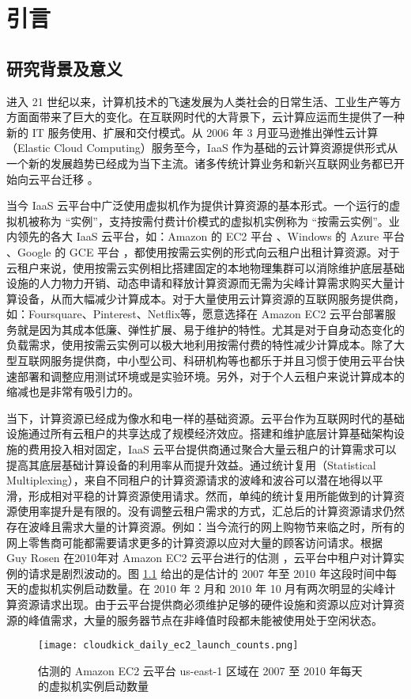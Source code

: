 \chapter{引言}
\label{cha:intro}

\section{研究背景及意义}
进入 21 世纪以来，计算机技术的飞速发展为人类社会的日常生活、工业生产等方方面面带来了巨大的变化。在互联网时代的大背景下，云计算应运而生提供了一种新的 IT 服务使用、扩展和交付模式。从 2006 年 3 月亚马逊推出弹性云计算（Elastic Cloud Computing）服务至今，IaaS 作为基础的云计算资源提供形式从一个新的发展趋势已经成为当下主流。诸多传统计算业务和新兴互联网业务都已开始向云平台迁移 \cite{Armbrust:2010:VCC:1721654.1721672}。

当今 IaaS 云平台中广泛使用虚拟机作为提供计算资源的基本形式。一个运行的虚拟机被称为 ``实例''，支持按需付费计价模式的虚拟机实例称为 ``按需云实例''。业内领先的各大 IaaS 云平台，如：Amazon 的 EC2 平台 \cite{AWS}、Windows 的 Azure 平台 \cite{Azure}、Google 的 GCE 平台 \cite{GCE}，都使用按需云实例的形式向云租户出租计算资源。对于云租户来说，使用按需云实例相比搭建固定的本地物理集群可以消除维护底层基础设施的人力物力开销、动态申请和释放计算资源而无需为尖峰计算需求购买大量计算设备，从而大幅减少计算成本。对于大量使用云计算资源的互联网服务提供商，如：Foursquare、Pinterest、Netflix等，愿意选择在 Amazon EC2 云平台部署服务就是因为其成本低廉、弹性扩展、易于维护的特性。尤其是对于自身动态变化的负载需求，使用按需云实例可以极大地利用按需付费的特性减少计算成本。除了大型互联网服务提供商，中小型公司、科研机构等也都乐于并且习惯于使用云平台快速部署和调整应用测试环境或是实验环境。另外，对于个人云租户来说计算成本的缩减也是非常有吸引力的。

当下，计算资源已经成为像水和电一样的基础资源。云平台作为互联网时代的基础设施通过所有云租户的共享达成了规模经济效应。搭建和维护底层计算基础架构设施的费用投入相对固定，IaaS 云平台提供商通过聚合大量云租户的计算需求可以提高其底层基础计算设备的利用率从而提升效益。通过统计复用（Statistical Multiplexing），来自不同租户的计算资源请求的波峰和波谷可以潜在地得以平滑，形成相对平稳的计算资源使用请求。然而，单纯的统计复用所能做到的计算资源使用率提升是有限的。没有调整云租户需求的方式，汇总后的计算资源请求仍然存在波峰且需求大量的计算资源。例如：当今流行的网上购物节来临之时，所有的网上零售商可能都需要请求更多的计算资源以应对大量的顾客访问请求。根据 Guy Rosen 在2010年对 Amazon EC2 云平台进行的估测 \cite{ec2dailyusage}，云平台中租户对计算实例的请求是剧烈波动的。图 \ref{figure:daily_ec2_launch_counts} 给出的是估计的 2007 年至 2010 年这段时间中每天的虚拟机实例启动数量。在 2010 年 2 月和 2010 年 10 月有两次明显的尖峰计算资源请求出现。由于云平台提供商必须维护足够的硬件设施和资源以应对计算资源的峰值需求，大量的服务器节点在非峰值时段都未能被使用处于空闲状态。
\begin{figure}
  \centering
  \texttt{[image: cloudkick\_daily\_ec2\_launch\_counts.png]}
  \caption{估测的 Amazon EC2 云平台 us-east-1 区域在 2007 至 2010 年每天的虚拟机实例启动数量 \cite{ec2dailyusage}}
  \label{figure:daily_ec2_launch_counts}
\end{figure}

